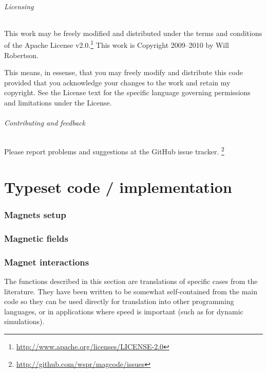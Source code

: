 \documentclass{article}
\begin{document}
\paragraph{Licensing}
This work may be freely modified and distributed under the terms and conditions of the Apache License v2.0.\footnote{\url{http://www.apache.org/licenses/LICENSE-2.0}}
This work is Copyright 2009--2010 by Will Robertson.

This means, in essense, that you may freely modify and distribute this
code provided that you acknowledge your changes to the work and retain
my copyright. See the License text for the specific language governing
permissions and limitations under the License.

\paragraph{Contributing and feedback}
Please report problems and suggestions at the GitHub issue tracker.%
\footnote{\url{http://github.com/wspr/magcode/issues}}

\printbibliography

\clearpage
\part{Typeset code / implementation}

\section{Magnets setup}


\section{Magnetic fields}


\section{Magnet interactions}

The functions described in this section are translations of specific cases from the literature.
They have been written to be somewhat self-contained from the main code so they can be used directly for translation into other programming languages, or in applications where speed is important (such as for dynamic simulations).
\end{document}
